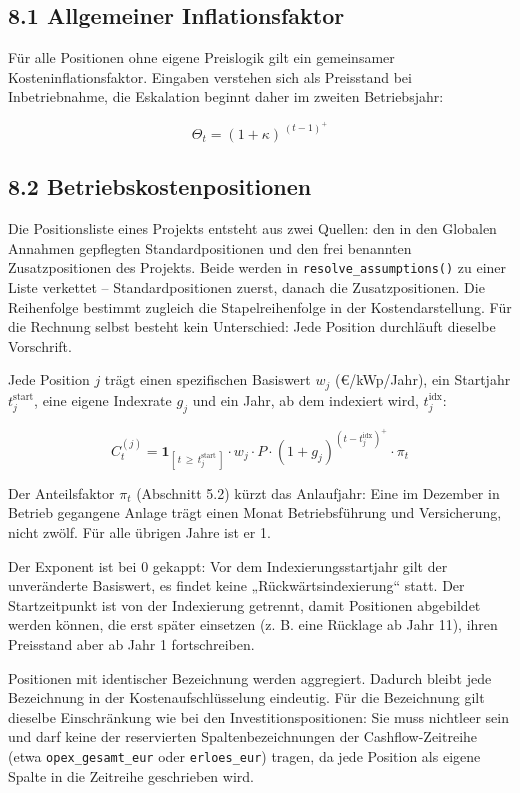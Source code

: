 \documentclass[
  a4paper,
  10pt]{article}
\begin{document}
\hypertarget{allgemeiner-inflationsfaktor}{%
\subsection{8.1 Allgemeiner
Inflationsfaktor}\label{allgemeiner-inflationsfaktor}}

Für alle Positionen ohne eigene Preislogik gilt ein gemeinsamer
Kosteninflationsfaktor. Eingaben verstehen sich als Preisstand bei
Inbetriebnahme, die Eskalation beginnt daher im zweiten Betriebsjahr:

\[ \Theta_t = (1 + \kappa)^{\,(t-1)^{+}} \]

\hypertarget{betriebskostenpositionen}{%
\subsection{8.2
Betriebskostenpositionen}\label{betriebskostenpositionen}}

Die Positionsliste eines Projekts entsteht aus zwei Quellen: den in den
Globalen Annahmen gepflegten Standardpositionen und den frei benannten
Zusatzpositionen des Projekts. Beide werden in
\texttt{resolve\_assumptions()} zu einer Liste verkettet --
Standardpositionen zuerst, danach die Zusatzpositionen. Die Reihenfolge
bestimmt zugleich die Stapelreihenfolge in der Kostendarstellung. Für
die Rechnung selbst besteht kein Unterschied: Jede Position durchläuft
dieselbe Vorschrift.

Jede Position \(j\) trägt einen spezifischen Basiswert \(w_j\)
(€/kWp/Jahr), ein Startjahr \(t^{\mathrm{start}}_j\), eine eigene
Indexrate \(g_j\) und ein Jahr, ab dem indexiert wird,
\(t^{\mathrm{idx}}_j\):

\[ C^{(j)}_t = \mathbf{1}_{[\,t\, \geq\, t^{\mathrm{start}}_j\,]} \cdot w_j \cdot P \cdot (1 + g_j)^{\left(t - t^{\mathrm{idx}}_j\right)^{+}} \cdot \pi_t \]

Der Anteilsfaktor \(\pi_t\) (Abschnitt 5.2) kürzt das Anlaufjahr: Eine
im Dezember in Betrieb gegangene Anlage trägt einen Monat
Betriebsführung und Versicherung, nicht zwölf. Für alle übrigen Jahre
ist er 1.

Der Exponent ist bei \(0\) gekappt: Vor dem Indexierungsstartjahr gilt
der unveränderte Basiswert, es findet keine „Rückwärtsindexierung``
statt. Der Startzeitpunkt ist von der Indexierung getrennt, damit
Positionen abgebildet werden können, die erst später einsetzen (z. B.
eine Rücklage ab Jahr 11), ihren Preisstand aber ab Jahr 1
fortschreiben.

Positionen mit identischer Bezeichnung werden aggregiert. Dadurch bleibt
jede Bezeichnung in der Kostenaufschlüsselung eindeutig. Für die
Bezeichnung gilt dieselbe Einschränkung wie bei den
Investitionspositionen: Sie muss nichtleer sein und darf keine der
reservierten Spaltenbezeichnungen der Cashflow-Zeitreihe (etwa
\texttt{opex\_gesamt\_eur} oder \texttt{erloes\_eur}) tragen, da jede
Position als eigene Spalte in die Zeitreihe geschrieben wird.
\end{document}
